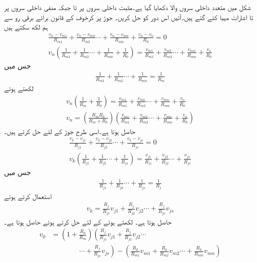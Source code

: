 شکل  میں متعدد داخلی سروں  والا  دکھایا گیا ہے۔مثبت داخلی سروں  پر  تا  جبکہ منفی داخلی سروں  پر  تا  اشارات مہیا کئے گئے ہیں۔آئیں اس دور کو حل کریں۔
جوڑ  پر کرخوف کے قانون برائے برقی رو سے ہم لکھ سکتے ہیں
\begin{align*}
\frac{v_n-v_{m1}}{R_{m1}}+\frac{v_n-v_{m2}}{R_{m2}} \cdots +\frac{v_n-v_{mn}}{R_{mn}}+\frac{v_n-v_o}{R_0}=0\\
v_n \left(\frac{1}{R_{m1}}+\frac{1}{R_{m2}}\cdots +\frac{1}{R_{mn}}+\frac{1}{R_0} \right)=\frac{v_{m1}}{R_{m1}}+\frac{v_{m2}}{R_{m2}}\cdots +\frac{v_{mn}}{R_{mn}}+\frac{v_o}{R_0}
\end{align*}
جس میں
\begin{align*}
\frac{1}{R_{m1}}+\frac{1}{R_{m2}}\cdots +\frac{1}{R_{mn}}=\frac{1}{R_m}
\end{align*}
لکھتے ہوئے
\begin{align*}
v_n \left(\frac{1}{R_m}+\frac{1}{R_0} \right)=\frac{v_{m1}}{R_{m1}}+\frac{v_{m2}}{R_{m2}}\cdots +\frac{v_{mn}}{R_{mn}}+\frac{v_o}{R_0}\\
v_n=\left(\frac{R_mR_0}{R_m+R_0} \right)\left(\frac{v_{m1}}{R_{m1}}+\frac{v_{m2}}{R_{m2}}\cdots +\frac{v_{mn}}{R_{mn}}+\frac{v_o}{R_0} \right)
\end{align*}
حاصل ہوتا ہے۔اسی طرح جوڑ  کے لئے حل کرتے ہیں۔
\begin{align*}
\frac{v_k-v_{j1}}{R_{j1}}+\frac{v_k-v_{j2}}{R_{j2}}\cdots +\frac{v_k-v_{js}}{R_{js}}=0\\
v_k \left(\frac{1}{R_{j1}}+ \frac{1}{R_{j2}}\cdots + \frac{1}{R_{js}}\right)=\frac{v_{j1}}{R_{j1}}+\frac{v_{j2}}{R_{j2}}\cdots+\frac{v_{js}}{R_{js}}
\end{align*}
جس میں
\begin{align*}
\frac{1}{R_{j1}}+ \frac{1}{R_{j2}}\cdots + \frac{1}{R_{js}}=\frac{1}{R_{j}}
\end{align*}
استعمال کرتے ہوئے 
\begin{align*}
v_k=\frac{R_j }{R_{j1}}v_{j1}+\frac{R_j }{R_{j2}}v_{j2}\cdots+\frac{R_j }{R_{js}}v_{js}
\end{align*}
حاصل ہوتا ہے۔ لکھتے ہوئے  کے لئے حل کرتے ہوئے حاصل ہوتا ہے۔
\begin{align} \label{مساوات_حسابی_جمع_و_منفی_کار}
v_0&=\left( 1+\frac{R_0}{R_m}\right)\left(\frac{R_j }{R_{j1}}v_{j1}+\frac{R_j }{R_{j2}}v_{j2}\cdots \right. \\
& \qquad  \qquad \left. \cdots +\frac{R_j }{R_{js}}v_{js} \right)-\left(\frac{R_0}{R_{m1}}v_{m1}+\frac{R_0}{R_{m2}}v_{m2}\cdots +\frac{R_0}{R_{mn}}v_{mn}\right)
\end{align}

